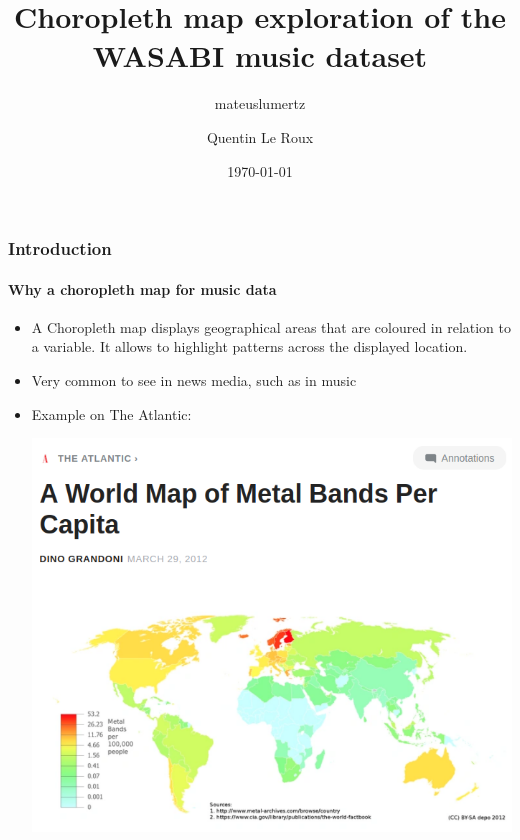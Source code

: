 \documentclass[aspectratio=43,10pt]{beamer}
\author{mateuslumertz}
\title[Choropleth map on WASABI]{Choropleth map exploration of the WASABI music dataset}
\author{Quentin Le Roux}
\date{\today}
\begin{document}
\begin{frame}[plain]
\maketitle
\end{frame}

\begin{frame}
    \frametitle{Introduction}
    \framesubtitle{Why a choropleth map for music data}
    
    \begin{itemize}
        \item A Choropleth map displays geographical areas that are coloured in relation to a variable. It allows to highlight patterns across the displayed location.
        \item Very common to see in news media, such as in music
        \item Example on The Atlantic:
        \begin{center}
            \includegraphics[width=0.6\linewidth]{imagens/atlantic_article.png}
        \end{center}
    \end{itemize}
\end{frame}
\end{document}

